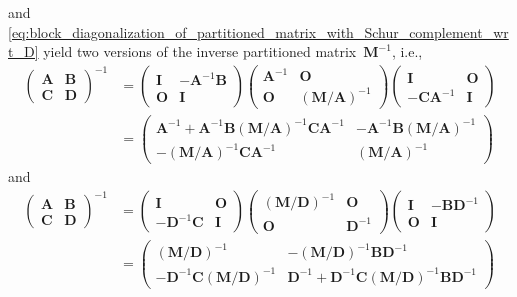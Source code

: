 \documentclass[12pt,a4paper]{article}
\begin{document}
and \eqref{eq:block_diagonalization_of_partitioned_matrix_with_Schur_complement_wrt_D} yield
two versions of the inverse partitioned matrix~$\mathbf{M}^{-1}$, i.e.,
\begin{align}
\begin{pmatrix}
\mathbf{A} & \mathbf{B} \\
\mathbf{C} & \mathbf{D}
\end{pmatrix}^{-1}
&=
\begin{pmatrix}
\mathbf{I} & -\mathbf{A}^{-1}\mathbf{B} \\
\mathbf{O} & \mathbf{I}
\end{pmatrix}
\begin{pmatrix}
\mathbf{A}^{-1} & \mathbf{O} \\
\mathbf{O} & \left(\mathbf{M}/\mathbf{A}\right)^{-1}
\end{pmatrix}
\begin{pmatrix}
\mathbf{I} & \mathbf{O} \\
-\mathbf{C}\mathbf{A}^{-1} & \mathbf{I}
\end{pmatrix} \\
&=
\begin{pmatrix}
\mathbf{A}^{-1} +
\mathbf{A}^{-1}\mathbf{B} \left(\mathbf{M}/\mathbf{A}\right)^{-1} \mathbf{C}\mathbf{A}^{-1} &
-\mathbf{A}^{-1}\mathbf{B} \left(\mathbf{M}/\mathbf{A}\right)^{-1} \\
-\left(\mathbf{M}/\mathbf{A}\right)^{-1} \mathbf{C}\mathbf{A}^{-1} &
\left(\mathbf{M}/\mathbf{A}\right)^{-1}
\end{pmatrix}
\end{align}
and
\begin{align}
\begin{pmatrix}
\mathbf{A} & \mathbf{B} \\
\mathbf{C} & \mathbf{D}
\end{pmatrix}^{-1}
&=
\begin{pmatrix}
\mathbf{I} & \mathbf{O} \\
-\mathbf{D}^{-1}\mathbf{C} & \mathbf{I}
\end{pmatrix}
\begin{pmatrix}
\left(\mathbf{M}/\mathbf{D}\right)^{-1} & \mathbf{O} \\
\mathbf{O} & \mathbf{D}^{-1}
\end{pmatrix}
\begin{pmatrix}
\mathbf{I} & -\mathbf{B}\mathbf{D}^{-1} \\
\mathbf{O} & \mathbf{I}
\end{pmatrix} \\
&=
\begin{pmatrix}
\left(\mathbf{M}/\mathbf{D}\right)^{-1} &
-\left(\mathbf{M}/\mathbf{D}\right)^{-1} \mathbf{B}\mathbf{D}^{-1} \\
-\mathbf{D}^{-1}\mathbf{C} \left(\mathbf{M}/\mathbf{D}\right)^{-1} &
\mathbf{D}^{-1} +
\mathbf{D}^{-1}\mathbf{C} \left(\mathbf{M}/\mathbf{D}\right)^{-1} \mathbf{B}\mathbf{D}^{-1}
\end{pmatrix}
\end{align}
\end{document}
